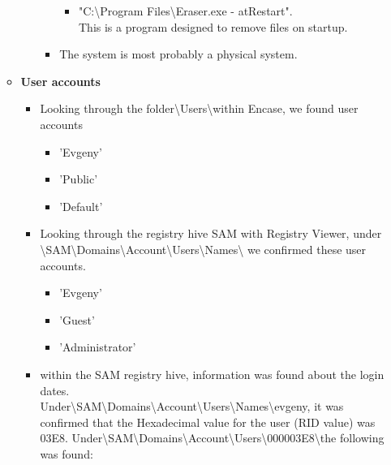 \begin{enumerate}
\begin{itemize}
\begin{itemize}
\begin{itemize}
			\begin{itemize}
				\item "C:\textbackslash Program Files\textbackslash Eraser.exe - atRestart".\\ 
				This is a program designed to remove files on startup.
			\end{itemize}
			
			\item The system is most probably a physical system.
			
		\end{itemize}
	\end{itemize}
	
	\newpage
	\item \textbf{User accounts}
	\begin{itemize}
		\item Looking through the folder\textbackslash Users\textbackslash within Encase, we found user accounts 
		
		\begin{itemize}
			\item 'Evgeny'
			\item 'Public'
			\item 'Default'
		\end{itemize} 
		
		\item Looking through the registry hive SAM with Registry Viewer, under
		\textbackslash SAM\textbackslash Domains\textbackslash Account\textbackslash Users\textbackslash Names\textbackslash
		we confirmed these user accounts.
		
		\begin{itemize}
			\item 'Evgeny'
			\item 'Guest'
			\item 'Administrator'
		\end{itemize}
		
		\item within the SAM registry hive, information was found about the login dates.\\ 
		Under\textbackslash SAM\textbackslash Domains\textbackslash Account\textbackslash Users\textbackslash Names\textbackslash evgeny, it was confirmed that the Hexadecimal value for the user (RID value) was 03E8. 
		Under\textbackslash SAM\textbackslash Domains\textbackslash Account\textbackslash Users\textbackslash 000003E8\textbackslash the following was found:
		

\end{itemize}
\end{itemize}
\end{enumerate}
